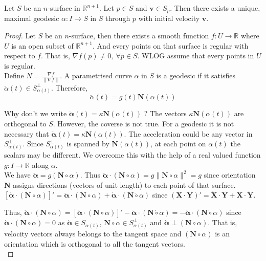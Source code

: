 \begin{theorem}
	Let $S$ be an $n$-surface in $\mathbb{R}^{n+1}$.
	Let $p \in S$ and $\mathbf{v} \in S_p$.
	Then there exists a unique, maximal geodesic $\alpha : I \to S$ in $S$ through $p$ with initial velocity $\mathbf{v}$.
\end{theorem}
\begin{proof}
	Let $S$ be an $n$-surface, then there exists a smooth function $f : U \to \mathbb{R}$ where $U$ is an open subset of $\mathbb{R}^{n+1}$.
	And every points on that surface is regular with respect to $f$.
	That is, $\nabla f(p) \ne 0,\ \forall p \in S$.
	WLOG assume that every points in $U$ is regular.\\
	

	Define $N = \frac{\nabla f}{\|\nabla f\|}$.
	A parametrised curve $\alpha$ in $S$ is a geodesic if it satisfies $\ddot{\alpha}(t) \in S_{\alpha(t)}^\perp$.
	Therefore,
	\begin{equation}
		\ddot{\alpha}(t) = g(t)\mathbf{N}(\alpha(t))
		\label{eq:acceleration}
	\end{equation}
	

	Why don't we write $\ddot{\boldsymbol{\alpha}}(t) = \kappa \mathbf{N}(\alpha(t))$ ? The vectors $\kappa \mathbf{N}(\alpha(t))$ are orthogonal to $S$.
	However, the coverse is not true.
	For a geodesic it is not necessary that $\ddot{\boldsymbol{\alpha}}(t) =  \kappa \mathbf{N}(\alpha(t))$.
	The acceleration could be any vector in $S_{\alpha(t)}^\perp$.
	Since $S_{\alpha(t)}^\perp$ is spanned by $\mathbf{N}(\alpha(t))$, at each point on $\alpha(t)$ the scalars may be different.
	We overcome this with the help of a real valued function $g : I \to \mathbb{R}$ along $\alpha$.\\


	We have $\ddot{\boldsymbol{\alpha}} = g(\mathbf{N}\circ \alpha)$.
	Thus $\ddot{\boldsymbol{\alpha}} \cdot (\mathbf{N}\circ\alpha) = g \| \mathbf{N}\circ \alpha \|^2 = g$ since orientation $\mathbf{N}$ assigns directions (vectors of unit length) to each point of that surface.\\


	$\left[\dot{\boldsymbol{\alpha}} \cdot (\mathbf{N} \circ \alpha)\right]' = \ddot{\boldsymbol{\alpha}} \cdot (\mathbf{N} \circ \alpha) + \dot{\boldsymbol{\alpha}} \cdot (\mathbf{N} \dot{\circ} \alpha)$	since $(\mathbf{X} \cdot \mathbf{Y})' = \dot{\mathbf{X}} \cdot \mathbf{Y} + \mathbf{X} \cdot \dot{\mathbf{Y}}$.

	Thus, $\ddot{\boldsymbol{\alpha}} \cdot (\mathbf{N} \circ \alpha) = \left[ \dot{\boldsymbol{\alpha}} \cdot (\mathbf{N} \circ \alpha) \right]' - \dot{\boldsymbol{\alpha}} \cdot (\mathbf{N} \dot{\circ} \alpha) = -\dot{\boldsymbol{\alpha}} \cdot (\mathbf{N} \dot{\circ} \alpha)$ since $\dot{\boldsymbol{\alpha}} \cdot (\mathbf{N} \circ \alpha) = 0$ as $\dot{\boldsymbol{\alpha}} \in S_{\alpha(t)}$, $\mathbf{N} \circ \alpha \in S_{\alpha(t)}^\perp$ and $\dot{\boldsymbol{\alpha}} \perp (\mathbf{N} \circ \alpha)$.
	That is, velocity vectors always belongs to the tangent space and $(\mathbf{N} \circ \alpha)$ is an orientation which is orthogonal to all the tangent vectors.\\



\end{proof}
